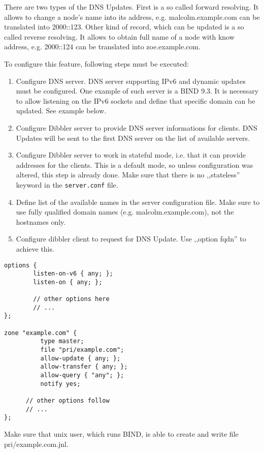 There are two types of the DNS Updates. First is a so called forward
resolving. It allows to change a node's name into its address,
e.g. malcolm.example.com can be translated into 2000::123. Other kind
of record, which can be updated is a so called reverse resolving. It
allows to obtain full name of a node with know address, e.g. 2000::124
can be translated into zoe.example.com.

To configure this feature, following steps must be executed:

\begin{enumerate}
\item Configure DNS server. DNS server supporting IPv6 and dynamic
  updates must be configured. One example of such server is a BIND
  9.3. It is necessary to allow listening on the IPv6 sockets and
  define that specific domain can be updated. See example below.
\item Configure Dibbler server to provide DNS server informations for
  clients. DNS Updates will be sent to the first DNS server on the
  list of available servers.
\item Configure Dibbler server to work in stateful mode, i.e. that it
  can provide addresses for the clients. This is a default mode, so
  unless configuration was altered, this step is already done. Make
  sure that there is no ,,stateless'' keyword in the
  \verb+server.conf+ file.
\item Define list of the available names in the server configuration
  file. Make sure to use fully qualified domain names
  (e.g. malcolm.example.com), not the hostnames only. 
\item Configure dibbler client to request for DNS Update. Use ,,option
  fqdn'' to achieve this. 
\end{enumerate}
  
\begin{Verbatim}
options {
        listen-on-v6 { any; };
        listen-on { any; };

        // other options here
        // ...
};

zone "example.com" {
          type master;
          file "pri/example.com";
          allow-update { any; };
          allow-transfer { any; };
          allow-query { "any"; };
          notify yes;

      // other options follow
      // ...
};
\end{Verbatim}

\Note Make sure that unix user, which runs BIND, is able to create and
write file pri/example.com.jnl. 


